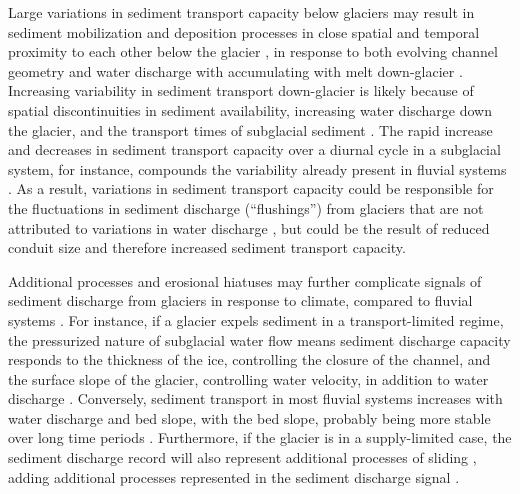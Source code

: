 \documentclass[11pt]{article}
\begin{document}
\begin{spacing}{1}
  Large variations in sediment transport capacity below glaciers may result in sediment mobilization and deposition processes in close spatial and temporal proximity to each other below the glacier \citep{gimbert2016,perolo2018}, in response to both evolving channel geometry and water discharge with accumulating with melt down-glacier \citep{beaud2018,delaney2019}.
  Increasing variability in sediment transport down-glacier is likely because of spatial discontinuities in sediment availability, increasing water discharge down the glacier, and the transport times of subglacial sediment \citep{williams1989,delaney2019}.
  The rapid increase and decreases in sediment transport capacity over a diurnal cycle in a subglacial system, for instance, compounds the variability already present in fluvial systems \citep{williams1989,jerolmack2010}.
  As a result, variations in sediment transport capacity could be responsible for the fluctuations in sediment discharge (``flushings'') from glaciers that are not attributed to variations in water discharge \citep[e.g.][]{richards2003,swift2021}, but could be the result of reduced conduit size and therefore increased sediment transport capacity.

  Additional processes and erosional hiatuses may further complicate signals of sediment discharge from glaciers in response to climate, compared to fluvial systems \citep{jansson2005,ganti2016}. 
  For instance, if a glacier expels sediment in a transport-limited regime, the pressurized nature of subglacial water flow means sediment discharge capacity responds to the thickness of the ice, controlling the closure of the channel, and the surface slope of the glacier, controlling water velocity, in addition to water discharge \citep[Section~\ref{sect:sub_mode}; ] []{rothlisberger1972,shreve1972}.
  Conversely, sediment transport in most fluvial systems increases with water discharge and bed slope, with the bed slope, probably being more stable over long time periods \citep[Section~\ref{sect:fluv}; e.g.][]{muller1968,whipple1999,wong2006}. 
  Furthermore, if the glacier is in a supply-limited case, the sediment discharge record will also represent additional processes of sliding  \citep{herman2015,seguinot2021}, adding additional processes represented in the sediment discharge signal \citep{delaney2019}.
  

\end{spacing}
\end{document}
